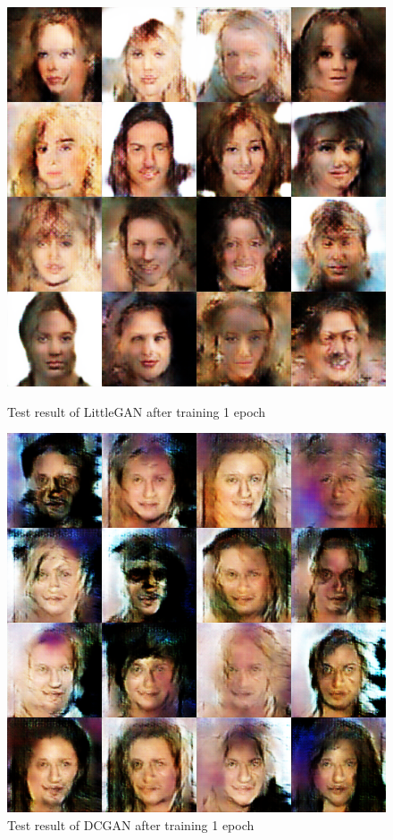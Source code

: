 \begin{figure}
    \begin{minipage}[t]{0.48\linewidth}
        \centering
        \includegraphics[width=\textwidth]{figures/result_littlegan_e1.png}
        \caption{Test result of LittleGAN after training 1 epoch}
        \label{littlegan_e1}
    \end{minipage}
        \hfill
    \begin{minipage}[t]{0.48\linewidth}
        \centering
        \includegraphics[width=\textwidth]{figures/result_dcgan_e1.png}
        \caption{Test result of DCGAN after training 1 epoch}
        \label{dcgan_e1}
    \end{minipage}
\end{figure}

